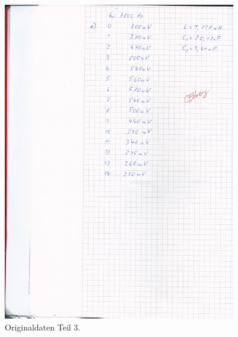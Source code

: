 \begin{figure}[H]
  \centering
  \includegraphics[height=14cm]{original-3.jpg}
  \caption{Originaldaten Teil 3.}
  \label{fig:original3}
\end{figure}
\printbibliography


